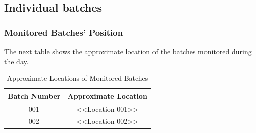 \documentclass[daily]{engenius}
\begin{document}

\subsection{Individual batches}

\subsubsection{Monitored Batches' Position}

The next table shows the approximate location of the batches monitored during the day.

\begin{table}[ht]
    \centering
    \begin{tabular}{|c|c|}
        \hline
        \textbf{Batch Number} & \textbf{Approximate Location} \\
        \hline
        001 & <<Location 001>> \\
        002 & <<Location 002>> \\
        \hline
    \end{tabular}
    \caption{Approximate Locations of Monitored Batches}
    \label{tab:batch_positions}
\end{table}






\end{document}
